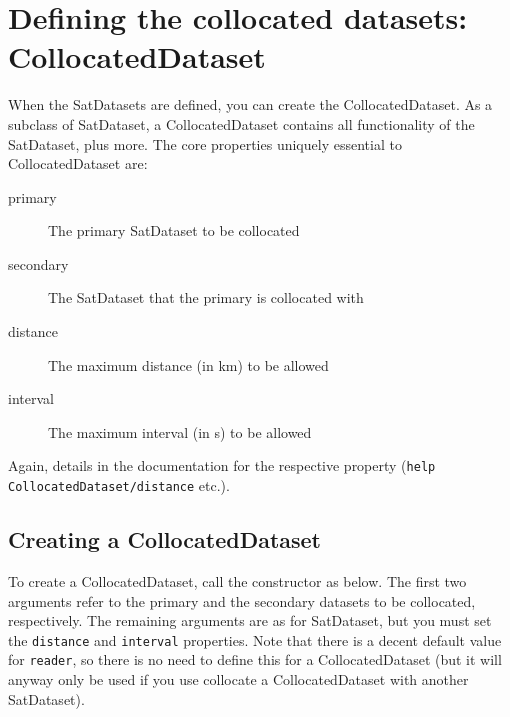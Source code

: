 \documentclass[a4paper,10pt]{article}
\begin{document}

\section{Defining the collocated datasets: CollocatedDataset}
\label{sec:CollocatedDataset}

When the SatDatasets are defined, you can create the CollocatedDataset.
As a subclass of SatDataset, a CollocatedDataset contains all
functionality of the SatDataset, plus more.
The core properties uniquely essential to CollocatedDataset are:

\begin{description}
\item[primary] The primary SatDataset to be collocated
\item[secondary] The SatDataset that the primary is collocated with
\item[distance] The maximum distance (in km) to be allowed
\item[interval] The maximum interval (in s) to be allowed
\end{description}

Again, details in the documentation for the respective property
(\lstinline|help CollocatedDataset/distance| etc.).

\subsection{Creating a CollocatedDataset}

To create a CollocatedDataset, call the constructor as below.
The first two arguments refer to the primary and the secondary datasets to
be collocated, respectively.
The remaining arguments are as for SatDataset, but you must set the
\lstinline|distance| and \lstinline|interval| properties.
Note that there is a decent default value for \lstinline|reader|, so there
is no need to define this for a CollocatedDataset (but it will anyway only
be used if you use collocate a CollocatedDataset with another SatDataset).
\end{document}

